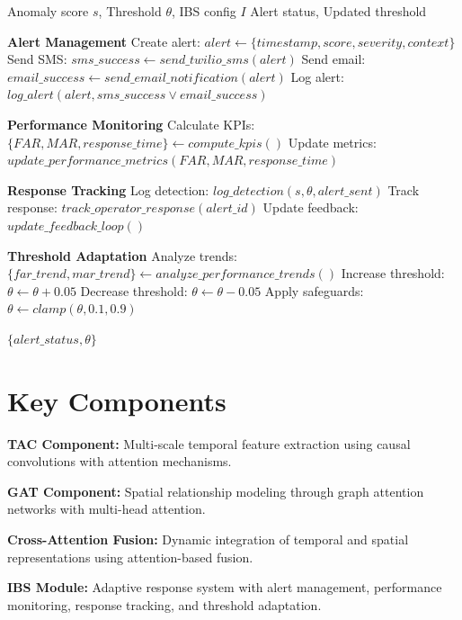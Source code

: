 \documentclass[conference]{IEEEtran}
\begin{document}
\begin{algorithm}[H]
\caption{IBS Adaptive Response Module}
\begin{algorithmic}[1]
\REQUIRE Anomaly score $s$, Threshold $\theta$, IBS config $I$
\ENSURE Alert status, Updated threshold

\STATE \textbf{Alert Management}
    \STATE Create alert: $alert \leftarrow \{timestamp, score, severity, context\}$
    \STATE Send SMS: $sms\_success \leftarrow send\_twilio\_sms(alert)$
        \STATE Send email: $email\_success \leftarrow send\_email\_notification(alert)$
    \ENDIF
    \STATE Log alert: $log\_alert(alert, sms\_success \lor email\_success)$
\ENDIF

\STATE \textbf{Performance Monitoring}
\STATE Calculate KPIs: $\{FAR, MAR, response\_time\} \leftarrow compute\_kpis()$
\STATE Update metrics: $update\_performance\_metrics(FAR, MAR, response\_time)$

\STATE \textbf{Response Tracking}
\STATE Log detection: $log\_detection(s, \theta, alert\_sent)$
\STATE Track response: $track\_operator\_response(alert\_id)$
\STATE Update feedback: $update\_feedback\_loop()$

\STATE \textbf{Threshold Adaptation}
\STATE Analyze trends: $\{far\_trend, mar\_trend\} \leftarrow analyze\_performance\_trends()$
    \STATE Increase threshold: $\theta \leftarrow \theta + 0.05$
    \STATE Decrease threshold: $\theta \leftarrow \theta - 0.05$
\ENDIF
\STATE Apply safeguards: $\theta \leftarrow clamp(\theta, 0.1, 0.9)$

\RETURN $\{alert\_status, \theta\}$
\end{algorithmic}
\end{algorithm}

\section{Key Components}

\textbf{TAC Component:} Multi-scale temporal feature extraction using causal convolutions with attention mechanisms.

\textbf{GAT Component:} Spatial relationship modeling through graph attention networks with multi-head attention.

\textbf{Cross-Attention Fusion:} Dynamic integration of temporal and spatial representations using attention-based fusion.

\textbf{IBS Module:} Adaptive response system with alert management, performance monitoring, response tracking, and threshold adaptation.
\end{document}
